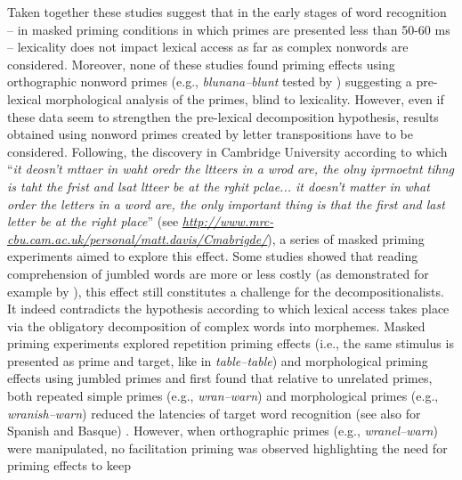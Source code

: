 \documentclass[output=paper]{langsci/langscibook}
\begin{document}
Taken together these studies suggest that in the early stages of word
recognition -- in masked priming conditions in which primes are
presented less than 50-60 ms -- lexicality does not impact lexical
access as far as complex nonwords are considered. Moreover, none of
these studies found priming effects using orthographic nonword primes
(e.g., \emph{blunana--blunt} tested by %
\citealt{McCormickRastleEtAl2009}%
%
) suggesting a pre-lexical morphological analysis of the primes, blind to
lexicality. However, even if these data seem to strengthen the
pre-lexical decomposition hypothesis, results obtained using nonword
primes created by letter transpositions have to be considered.
Following, the discovery in Cambridge University according to which
``\emph{it deosn't mttaer in waht oredr the ltteers in a wrod are, the
olny iprmoetnt tihng is taht the frist and lsat ltteer be at the rghit
pclae... it doesn't matter in what order the letters in a word are, the
only important thing is that the first and last letter be at the right
place}'' (see
\href{http://www.mrc-cbu.cam.ac.uk/personal/matt.davis/Cmabrigde/}{\emph{http://www.mrc-cbu.cam.ac.uk/personal/matt.davis/Cmabrigde/}}),
a series of masked priming experiments aimed to explore this effect.
Some studies showed that reading comprehension of jumbled words are more
or less costly (as demonstrated for example by %
\citealt{RaynerWhiteEtAl2006}%
), this effect still constitutes a challenge for the
decompositionalists. It indeed contradicts the hypothesis according to
which lexical access takes place via the obligatory decomposition of
complex words into morphemes. Masked priming experiments explored
repetition priming effects (i.e., the same stimulus is presented as
prime and target, like in \emph{table--table}) and morphological priming
effects using jumbled primes and %
\citet{BeyersmannColtheartCastles2012}
%
%
 first found that relative to unrelated primes, both repeated
simple primes (e.g., \emph{wran--warn}) and morphological primes (e.g.,
\emph{wranish--warn}) reduced the latencies of target word recognition %
(see also 
\citealt{ChristiansonJohnsonRayner2005,DunabeitiaPereaEtAl2007} %
for Spanish and Basque)%
%
%
. However, when orthographic
primes (e.g., \emph{wranel--warn}) were manipulated, no facilitation
priming was observed highlighting the need for priming effects to keep
\end{document}

